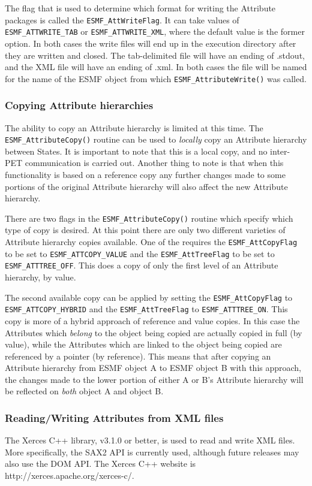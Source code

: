 The flag that is used to determine which format for writing the Attribute packages is called the {\tt ESMF\_AttWriteFlag}.  It can take values of {\tt ESMF\_ATTWRITE\_TAB} or {\tt ESMF\_ATTWRITE\_XML}, where the default value is the former option.  In both cases the write files will end up in the execution directory after they are written and closed.  The tab-delimited file will have an ending of .stdout, and the XML file will have an ending of .xml.  In both cases the file will be named for the name of the ESMF object from which {\tt ESMF\_AttributeWrite()} was called.

\subsubsection{Copying Attribute hierarchies}

The ability to copy an Attribute hierarchy is limited at this time.  The {\tt ESMF\_AttributeCopy()} routine can be used to {\it locally} copy an Attribute hierarchy between States.  It is important to note that this is a local copy, and no inter-PET communication is carried out.  Another thing to note is that when this functionality is based on a reference copy any further changes made to some portions of the original Attribute hierarchy will also affect the new Attribute hierarchy.

There are two flags in the {\tt ESMF\_AttributeCopy()} routine which specify which type of copy is desired.  At this point there are only two different varieties of Attribute hierarchy copies available.  One of the requires the {\tt ESMF\_AttCopyFlag} to be set to {\tt ESMF\_ATTCOPY\_VALUE} and the {\tt ESMF\_AttTreeFlag} to be set to {\tt ESMF\_ATTTREE\_OFF}.  This does a copy of only the first level of an Attribute hierarchy, by value.

The second available copy can be applied by setting the {\tt ESMF\_AttCopyFlag} to {\tt ESMF\_ATTCOPY\_HYBRID} and the {\tt ESMF\_AttTreeFlag} to {\tt ESMF\_ATTTREE\_ON}.  This copy is more of a hybrid approach of reference and value copies.  In this case the Attributes which {\it belong} to the object being copied are actually copied in full (by value), while the Attributes which are linked to the object being copied are referenced by a pointer (by reference).  This means that after copying an Attribute hierarchy from ESMF object A to ESMF object B with this approach, the changes made to the lower portion of either A or B's Attribute hierarchy will be reflected on {\it both} object A and object B.

\subsubsection{Reading/Writing Attributes from XML files}

The Xerces C++ library, v3.1.0 or better, is used to read and write XML files.  More specifically, the SAX2 API is currently used, although future releases may also use the DOM API.  The Xerces C++ website is http://xerces.apache.org/xerces-c/.
